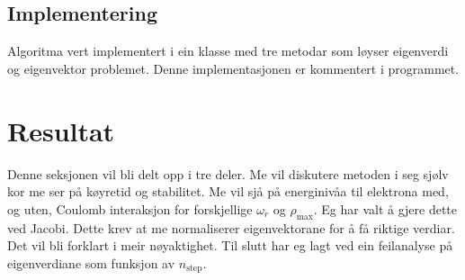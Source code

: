 \documentclass[11pt, a4paper]{article}
\begin{document}
  \subsection{Implementering}
    Algoritma vert implementert i ein klasse med tre metodar som løyser eigenverdi og eigenvektor problemet. Denne implementasjonen er kommentert i programmet.



\section{Resultat}
  Denne seksjonen vil bli delt opp i tre deler. Me vil diskutere metoden i seg sjølv kor me ser på køyretid og stabilitet. %
  Me vil sjå på energinivåa til elektrona med, og uten, Coulomb interaksjon for forskjellige $\omega_r$ og $\rho_{\text{max}}$. Eg har valt å gjere dette 
  ved Jacobi. Dette krev at me normaliserer eigenvektorane for å få riktige verdiar. Det vil bli forklart i meir nøyaktighet. %
  Til slutt har eg lagt ved ein feilanalyse på eigenverdiane som funksjon av $n_{\text{step}}$.
\end{document}
